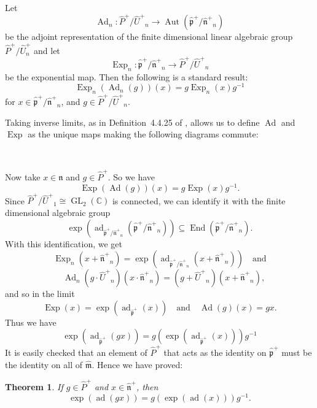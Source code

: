 \documentclass[11pt,letterpaper]{amsart}
\newcounter{thecounter}
\numberwithin{thecounter}{section}
\newtheorem{theorem}[thecounter]{Theorem}
\theoremstyle{definition}
\DeclareMathOperator{\GL}{GL}
\DeclareMathOperator{\Aut}{Aut}
\DeclareMathOperator{\End}{End}
\DeclareMathOperator{\Exp}{Exp}
\DeclareMathOperator{\Ad}{Ad}
\DeclareMathOperator{\ad}{ad}
\newcommand{\C}{{\mathbb C}}
\newcommand{\Uhp}{{\widehat{U}^+}}
\newcommand{\Php}{{\widehat{P}^+}}
\newcommand{\mhat}{{\widehat{\mathfrak{m}}}}
\newcommand{\nhp}{{\widehat{\mathfrak{n}}^+}}
\newcommand{\php}{\widehat{\mathfrak{p}}^+}
\begin{document}
Let
 $$\Ad_n:\Php / \Uhp_n \to\Aut\left(\php/\nhp_n\right)$$
be the adjoint representation of the finite dimensional linear algebraic group $\Php/ \widehat{U}^+_n$ and let
$$\Exp_n: \php/\nhp_n  \to \Php / \Uhp_n$$
be the exponential map. 
Then the following is a standard result:
$$\Exp_n\left(\Ad_n(g)\right)(x)=g\Exp_n(x) g^{-1}$$
for $x\in  \php/\nhp_n$, and $g \in  \Php / \Uhp_n$.

Taking inverse limits, as in Definition~4.4.25 of \cite{kumar2012kac}, allows us to define $\Ad$ and $\Exp$ as the unique maps making the following diagrams commute:
\begin{center}
$\qquad\qquad$
\end{center}

Now take $x\in \widehat{\mathfrak{n}}$ and $g\in \widehat{{P}}^+$.
So we have
$$\Exp\left(\Ad(g)\right)(x)=g\Exp(x) g^{-1}.$$
Since $\Php / \Uhp_1 \cong \GL_2(\C)$ is connected, we can identify it with the finite dimensional algebraic group 
$$\exp\left(\ad_{\php/\nhp_n}\left(\php / \nhp_n\right)\right)\subseteq\End\left(\php/\nhp_n\right).$$
With this identification, we get
$$ \Exp_n\left(x+\nhp_n\right) = \exp\left(\ad_{\php/\nhp_n}\left(x+\nhp_n\right)\right)\quad\text{and}$$
$$\quad \Ad_n\left(g\cdot\Uhp_n\right)\left(x\cdot\nhp_n\right)=\left(g+\Uhp_n\right)\left(x+\nhp_n\right),$$
and so in the limit
$$ \Exp(x) = \exp\left(\ad_{\php}(x)\right)\quad\text{and}\quad \Ad(g)(x)=gx.$$
Thus we have
$$ \exp\left(\ad_{\php}(gx)\right)= g\left(\exp\left(\ad_{\php}(x)\right)\right)g^{-1}$$
It is easily checked that an element of $\Php$ that acts as the identity on $\php$ must be the identity on all of $\mhat$.
Hence we have proved:
\begin{theorem}\label{T-adjoint}
If $g\in\Php$ and $x\in \nhp$, then
$$ \exp\left(\ad(gx)\right)= g\left(\exp\left(\ad(x)\right)\right)g^{-1}.$$
\end{theorem}
\end{document}
